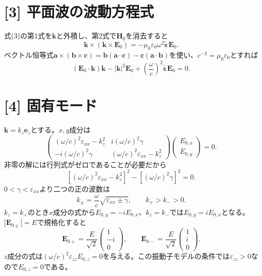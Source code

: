 \documentclass[11pt,a4paper]{article}
\begin{document}
\section*{[3] 平面波の波動方程式}
式(3)の第1式を$\boldsymbol k$と外積し、第2式で$\boldsymbol H_0$を消去すると
\begin{equation}
 \boldsymbol k\times(\boldsymbol k\times\boldsymbol E_0)
 =-\mu_0\varepsilon_0\omega^2\tilde{\boldsymbol\varepsilon}\boldsymbol E_0.
\end{equation}
ベクトル恒等式$\boldsymbol a\times(\boldsymbol b\times\boldsymbol c)=\boldsymbol b(\boldsymbol a\cdot\boldsymbol c)-\boldsymbol c(\boldsymbol a\cdot\boldsymbol b)$を使い、$c^{-2}=\mu_0\varepsilon_0$とすれば
\begin{equation}
 \boxed{(\boldsymbol E_0\cdot\boldsymbol k)\boldsymbol k-|\boldsymbol k|^2\boldsymbol E_0
 +\left(\frac{\omega}{c}\right)^2\tilde{\boldsymbol\varepsilon}\boldsymbol E_0=0}.
\end{equation}

\section*{[4] 固有モード}
$\boldsymbol k=k_z\boldsymbol e_z$とする。$x,y$成分は
\begin{equation}
 \begin{pmatrix}
 (\omega/c)^2\varepsilon_{xx}-k_z^2&i(\omega/c)^2\gamma\\
 -i(\omega/c)^2\gamma&(\omega/c)^2\varepsilon_{xx}-k_z^2
 \end{pmatrix}
 \begin{pmatrix}E_{0,x}\\E_{0,y}\end{pmatrix}=0.
\end{equation}
非零の解には行列式がゼロであることが必要だから
\begin{equation}
 \left[(\omega/c)^2\varepsilon_{xx}-k_z^2\right]^2
 -\left[(\omega/c)^2\gamma\right]^2=0.
\end{equation}
$0<\gamma<\varepsilon_{xx}$より二つの正の波数は
\begin{equation}
 \boxed{k_\pm=\frac{\omega}{c}\sqrt{\varepsilon_{xx}\pm\gamma}},\qquad k_+>k_->0.
\end{equation}
$k_z=k_+$のとき$x$成分の式から$E_{0,y}=-iE_{0,x}$、$k_z=k_-$では$E_{0,y}=iE_{0,x}$となる。$|\boldsymbol E_{0\pm}|=E$で規格化すると
\begin{equation}
 \boxed{\boldsymbol E_{0+}=\frac{E}{\sqrt2}\begin{pmatrix}1\\-i\\0\end{pmatrix},\qquad
 \boldsymbol E_{0-}=\frac{E}{\sqrt2}\begin{pmatrix}1\\i\\0\end{pmatrix}}.
\end{equation}
$z$成分の式は$(\omega/c)^2\varepsilon_{zz}E_{0,z}=0$を与える。この振動子モデルの条件では$\varepsilon_{zz}>0$なので$E_{0,z}=0$である。
\end{document}
